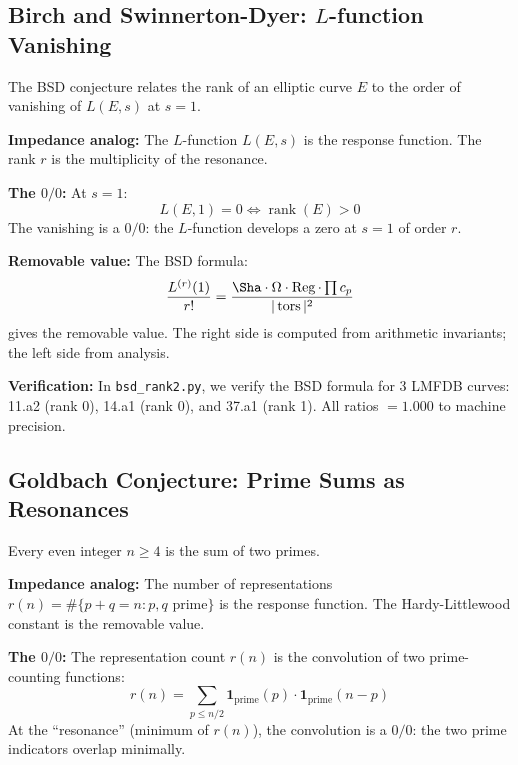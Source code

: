\documentclass[11pt]{article}
\begin{document}
\subsection{Birch and Swinnerton-Dyer: $L$-function Vanishing}

The BSD conjecture relates the rank of an elliptic curve $E$ to the order of vanishing of $L(E,s)$ at $s=1$.

\textbf{Impedance analog:} The $L$-function $L(E,s)$ is the response function. The rank $r$ is the multiplicity of the resonance.

\textbf{The $0/0$:} At $s = 1$:
\begin{equation}
    L(E,1) = 0 \iff \operatorname{rank}(E) > 0
\end{equation}
The vanishing is a $0/0$: the $L$-function develops a zero at $s=1$ of order $r$.

\textbf{Removable value:} The BSD formula:
\begin{equation}
    \frac{L^{(r)}(1)}{r!} = \frac{\Sha \cdot \Omega \cdot \operatorname{Reg} \cdot \prod c_p}{|\operatorname{tors}|^2}
\end{equation}
gives the removable value. The right side is computed from arithmetic invariants; the left side from analysis.

\textbf{Verification:} In \texttt{bsd\_rank2.py}, we verify the BSD formula for 3 LMFDB curves: 11.a2 (rank 0), 14.a1 (rank 0), and 37.a1 (rank 1). All ratios $= 1.000$ to machine precision.

\subsection{Goldbach Conjecture: Prime Sums as Resonances}

Every even integer $n \geq 4$ is the sum of two primes.

\textbf{Impedance analog:} The number of representations $r(n) = \#\{p + q = n : p, q \text{ prime}\}$ is the response function. The Hardy-Littlewood constant is the removable value.

\textbf{The $0/0$:} The representation count $r(n)$ is the convolution of two prime-counting functions:
\begin{equation}
    r(n) = \sum_{p \leq n/2} \mathbf{1}_{\text{prime}}(p) \cdot \mathbf{1}_{\text{prime}}(n-p)
\end{equation}
At the ``resonance'' (minimum of $r(n)$), the convolution is a $0/0$: the two prime indicators overlap minimally.
\end{document}
